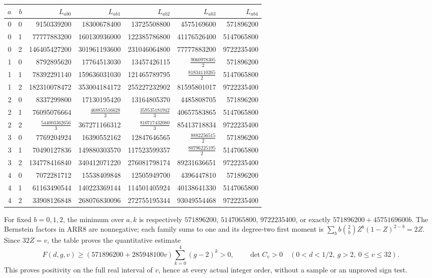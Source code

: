 \documentclass[11pt]{article}
\begin{document}
\begin{center}
\scriptsize
\begin{tabular}{rr|rrrrr}
$a$&$b$&$L_{ab0}$&$L_{ab1}$&$L_{ab2}$&$L_{ab3}$&$L_{ab4}$\\\hline
0&0&9150339200&18300678400&13725508800&4575169600&571896200\\
0&1&77777883200&160130936000&122385786800&41176526400&5147065800\\
0&2&146405427200&301961193600&231046064800&77777883200&9722235400\\
1&0&8792895620&17764513030&13457426115&$\frac{9060978305}{2}$&571896200\\
1&1&78392291140&159636031030&121465789795&$\frac{81834110265}{2}$&5147065800\\
1&2&182310078472&353004184172&255227232902&81595801017&9722235400\\
2&0&8337299800&17130195420&13164805370&4485808705&571896200\\
2&1&76095076664&$\frac{468855516628}{3}$&$\frac{359535181942}{3}$&40657583865&5147065800\\
2&2&$\frac{544003362656}{3}$&367271166312&$\frac{810717432080}{3}$&85413718834&9722235400\\
3&0&7769204924&16390552162&12847646565&$\frac{8882256515}{2}$&571896200\\
3&1&70490127836&149880303570&117523599357&$\frac{80796225195}{2}$&5147065800\\
3&2&134778416840&340412071220&276081798174&89231636651&9722235400\\
4&0&7072281712&15538409848&12505949700&4396447810&571896200\\
4&1&61163490544&140223369144&114501405924&40138641330&5147065800\\
4&2&33908126848&268076830096&272755195344&93049554468&9722235400\\
\end{tabular}
\end{center}

For fixed $b=0,1,2$, the minimum over $a,k$ is respectively
$571896200$, $5147065800$, $9722235400$, or exactly
$571896200+4575169600b$. The Bernstein factors in ARR8 are
nonnegative; each family sums to one and its degree-two first
moment is $\sum_b b\binom2bZ^b(1-Z)^{2-b}=2Z$.
Since $32Z=v$, the table proves the quantitative estimate
\[
 F(d,g,v)\ge(571896200+285948100v)\sum_{k=0}^4(g-2)^k>0,
 \qquad\det C_v>0
 \quad(0<d<1/2,\ g>2,\ 0\le v\le32).
 \tag{ARR9}
\]
This proves positivity on the full real interval of $v$, hence at
every actual integer order, without a sample or an unproved sign test.
\end{document}
